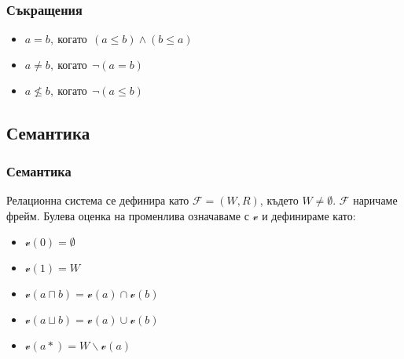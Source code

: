 \documentclass{beamer}
\begin{document}
\begin{frame}\frametitle{Съкращения}
		\begin{itemize}
		\item $a = b,\:\textit{когато}\:\: (a \le b) \land (b \le a)$
		\item $a \neq b,\:\textit{когато}\:\: \neg (a = b) $
		\item $a \nleq b,\:\textit{когато}\:\: \neg (a \le b)$
		\end{itemize}
\end{frame}

\subsection{Семантика}
\begin{frame}\frametitle{Семантика}
	Релационна система се дефинира като $\mathcal{F} = (W, R)$, където $W \neq \emptyset$. $\mathcal{F}$ наричаме фрейм.
	\newline
	\newline
	Булева оценка на променлива означаваме с  $\mathscr{v}$ и дефинираме като:
		\begin{itemize}
			\item $\mathscr{v}(0) = \emptyset$
			\item $\mathscr{v}(1) = W$
			\item $\mathscr{v}(a \sqcap b) = \mathscr{v}(a) \cap \mathscr{v}(b)$
			\item $\mathscr{v}(a \sqcup b) = \mathscr{v}(a) \cup \mathscr{v}(b)$
			\item $\mathscr{v}(a*) = W \backslash  \mathscr{v}(a)$
		\end{itemize}
	
\end{frame}
\end{document}
